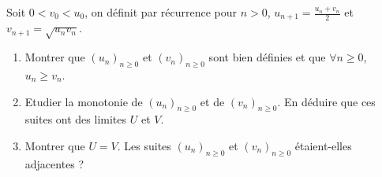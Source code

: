 
Soit $0 < v_0 < u_0$, on définit par récurrence pour $n > 0$, $u_{n+1} = \frac{u_n+v_n}{2}$ et $v_{n+1} = \sqrt{u_n v_n}$.

\begin{enumerate}

\item Montrer que $(u_n)_{n \ge 0}$ et $(v_n)_{n \ge 0}$ sont bien définies et que $\forall n \ge 0$, $u_n \ge v_n$.

\item Etudier la monotonie de $(u_n)_{n \ge 0}$ et de $(v_n)_{n \ge 0}$. En déduire que ces suites ont des limites $U$ et $V$.

\item Montrer que $U =V$. Les suites $(u_n)_{n \ge 0}$ et $(v_n)_{n \ge 0}$ étaient-elles adjacentes ?


\end{enumerate}


